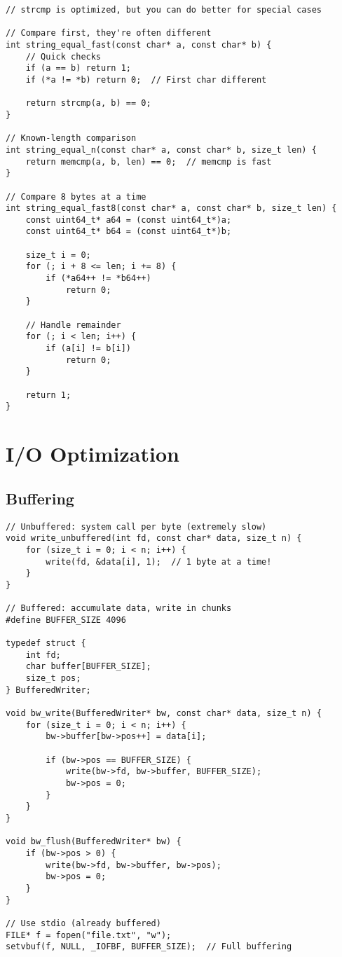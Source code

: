 \begin{lstlisting}
// strcmp is optimized, but you can do better for special cases

// Compare first, they're often different
int string_equal_fast(const char* a, const char* b) {
    // Quick checks
    if (a == b) return 1;
    if (*a != *b) return 0;  // First char different

    return strcmp(a, b) == 0;
}

// Known-length comparison
int string_equal_n(const char* a, const char* b, size_t len) {
    return memcmp(a, b, len) == 0;  // memcmp is fast
}

// Compare 8 bytes at a time
int string_equal_fast8(const char* a, const char* b, size_t len) {
    const uint64_t* a64 = (const uint64_t*)a;
    const uint64_t* b64 = (const uint64_t*)b;

    size_t i = 0;
    for (; i + 8 <= len; i += 8) {
        if (*a64++ != *b64++)
            return 0;
    }

    // Handle remainder
    for (; i < len; i++) {
        if (a[i] != b[i])
            return 0;
    }

    return 1;
}
\end{lstlisting}

\section{I/O Optimization}

\subsection{Buffering}

\begin{lstlisting}
// Unbuffered: system call per byte (extremely slow)
void write_unbuffered(int fd, const char* data, size_t n) {
    for (size_t i = 0; i < n; i++) {
        write(fd, &data[i], 1);  // 1 byte at a time!
    }
}

// Buffered: accumulate data, write in chunks
#define BUFFER_SIZE 4096

typedef struct {
    int fd;
    char buffer[BUFFER_SIZE];
    size_t pos;
} BufferedWriter;

void bw_write(BufferedWriter* bw, const char* data, size_t n) {
    for (size_t i = 0; i < n; i++) {
        bw->buffer[bw->pos++] = data[i];

        if (bw->pos == BUFFER_SIZE) {
            write(bw->fd, bw->buffer, BUFFER_SIZE);
            bw->pos = 0;
        }
    }
}

void bw_flush(BufferedWriter* bw) {
    if (bw->pos > 0) {
        write(bw->fd, bw->buffer, bw->pos);
        bw->pos = 0;
    }
}

// Use stdio (already buffered)
FILE* f = fopen("file.txt", "w");
setvbuf(f, NULL, _IOFBF, BUFFER_SIZE);  // Full buffering
\end{lstlisting}

